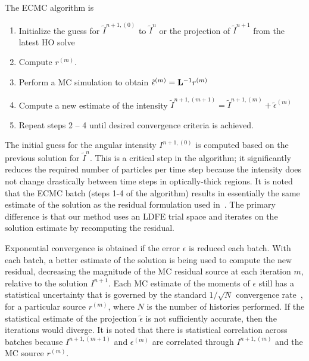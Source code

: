 The ECMC algorithm is
\begin{enumerate}
    \item Initialize the guess for $\tilde{I}^{n+1,(0)}$ to $\tilde{I}^{n}$ or the
        projection of $\tilde{I}^{n+1}$ from the latest HO solve
\item Compute $r^{(m)}$.
\item Perform a MC simulation to obtain $\tilde{\epsilon}^{(m)} = \mathbf{L}^{-1} r^{(m)}$
\item Compute a new estimate of the intensity $\tilde I^{n+1,(m+1)} = \tilde I^{n+1,(m)}
+ \tilde\epsilon^{(m)}$
\item Repeat steps 2 -- 4 until desired convergence criteria is achieved. 
\end{enumerate}
The initial guess for the angular intensity $I^{n+1,(0)}$ is computed based on the previous solution
for $\tilde{I}^{n}$. This is a critical step in the algorithm; it significantly reduces the required number of
particles per time step because the intensity does not change drastically between time steps in
optically-thick regions.  It is noted that the ECMC batch (steps 1-4 of the
algorithm) results in essentially the same estimate of the solution as the residual
formulation used in~\cite{rmc}.  The primary difference is that our method uses an LDFE trial
space and iterates on the solution estimate by recomputing the residual.

Exponential convergence is obtained if the error $\epsilon$ is reduced each batch.  With each batch, a
better estimate of the solution is being used to compute the new residual, decreasing
the magnitude of the MC residual source at each iteration $m$, relative to the solution
$I^{n+1}$.  Each MC
estimate of the moments of $\epsilon$ still has a statistical uncertainty that is
governed by the standard $1/\sqrt{N}$ convergence rate~\cite{shultis_mc}, for a
particular source $r^{(m)}$, where $N$ is the number of histories performed.  If the statistical estimate of the projection $\tilde\epsilon$ is not sufficiently
accurate, then the iterations would diverge. It is noted that there is statistical correlation across batches because
$I^{n+1,(m+1)}$ and $\epsilon^{(m)}$ are correlated through $I^{n+1,(m)}$ and the MC source $r^{(m)}$.  

